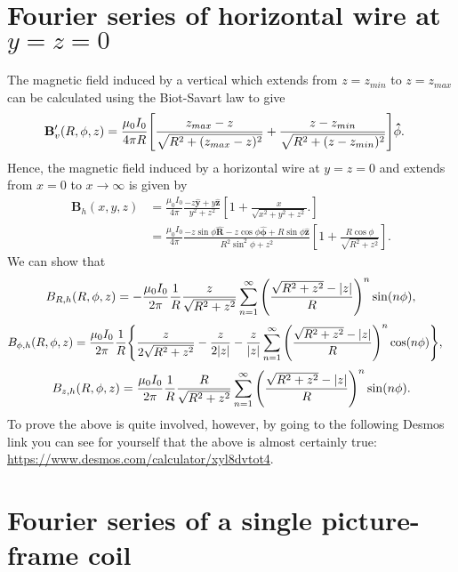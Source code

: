 \documentclass{article}
\let\vec\mathbf
\begin{document}
\section{Fourier series of horizontal wire at $y=z=0$}

The magnetic field induced by a vertical which extends from
$z=z_{min}$ to $z=z_{max}$ can be calculated using the Biot-Savart law to give
\[
\begin{aligned}
    \vec{B}_{v}'(R, \phi, z) &= \frac{\mu_0 I_0}{4\pi R}\qty[\frac{z_{max}-z}{\sqrt{R^2+(z_{max}-z)^2}} + \frac{z-z_{min}}{\sqrt{R^2+(z-z_{min})^2}}]\vec{\hat{\phi}}.
\end{aligned}\]
Hence, the magnetic field induced by a horizontal wire at $y=z=0$ 
and extends from $x=0$ to $x\rightarrow\infty$ is given by
\[\begin{aligned}
    \vec{B}_{h}(x, y, z) &= \frac{\mu_0 I_0}{4\pi}\frac{-z\vec{\hat{y}} + y\vec{\hat{z}}}{y^2+z^2}\left[1+\frac{x}{\sqrt{x^2+y^2+z^2}}.\right] \\
    &= \frac{\mu_0 I_0}{4\pi}\frac{-z\sin\phi\vec{\hat{R}} -z\cos\phi\vec{\hat{\phi}} + R\sin\phi\vec{\hat{z}}}{R^2\sin^2\phi+z^2}\left[1+\frac{R\cos\phi}{\sqrt{R^2+z^2}}\right].
\end{aligned}\]
We can show that
\[\begin{aligned}
B_{R, h}(R, \phi, z) &= -\frac{\mu_0 I_0}{2 \pi}\frac{1}{R}\frac{z}{\sqrt{R^2+z^2}}\sum_{n=1}^{\infty}\qty(\frac{\sqrt{R^2+z^2}-\abs{z}}{R})^n\sin(n\phi), \\
\end{aligned}\]
\[\begin{aligned}
    B_{\phi, h}(R, \phi, z)&=\frac{\mu_0 I_0}{2 \pi}\frac{1}{R}\qty{\frac{z}{2\sqrt{R^2+z^2}}-\frac{z}{2\abs{z}}-\frac{z}{\abs{z}}\sum_{n=1}^{\infty}\qty(\frac{\sqrt{R^2+z^2}-\abs{z}}{R})^n\cos(n\phi)},
\end{aligned}
\]
\[\begin{aligned}
B_{z, h}(R, \phi, z) &= \frac{\mu_0 I_0}{2 \pi}\frac{1}{R}\frac{R}{\sqrt{R^2+z^2}}\sum_{n=1}^\infty\qty(\frac{\sqrt{R^2+z^2}-\abs{z}}{R})^n\sin(n\phi). \\
\end{aligned}\]
To prove the above is quite involved, however, by going to the following
Desmos link you can see for yourself that the above is almost certainly true:
\url{https://www.desmos.com/calculator/xyl8dvtot4}.

\section{Fourier series of a single picture-frame coil}
\end{document}
